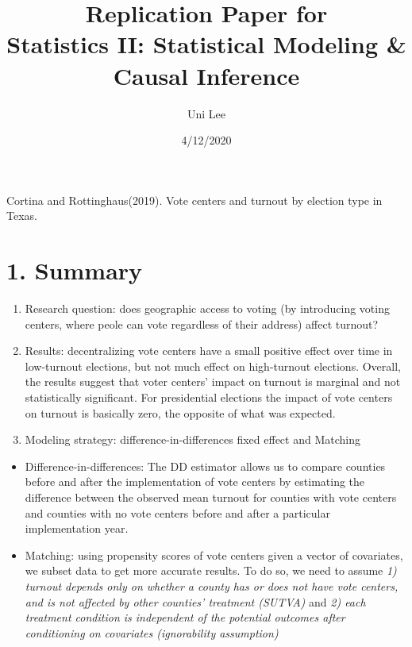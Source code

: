 \documentclass[
]{article}
\title{Replication Paper for\\
Statistics II: Statistical Modeling \& Causal Inference}
\author{Uni Lee}
\date{4/12/2020}
\providecommand{\tightlist}{%
  \setlength{\itemsep}{0pt}\setlength{\parskip}{0pt}}
\begin{document}
\maketitle

{
\setcounter{tocdepth}{2}
\tableofcontents
}
Cortina and Rottinghaus(2019). Vote centers and turnout by election type
in Texas.

\hypertarget{summary}{%
\section{1. Summary}\label{summary}}

\begin{enumerate}
\def\labelenumi{\arabic{enumi}.}
\item
  Research question: does geographic access to voting (by introducing
  voting centers, where peole can vote regardless of their address)
  affect turnout?
\item
  Results: decentralizing vote centers have a small positive effect over
  time in low-turnout elections, but not much effect on high-turnout
  elections. Overall, the results suggest that voter centers' impact on
  turnout is marginal and not statistically significant. For
  presidential elections the impact of vote centers on turnout is
  basically zero, the opposite of what was expected.
\item
  Modeling strategy: difference-in-differences fixed effect and Matching
\end{enumerate}

\begin{itemize}
\tightlist
\item
  Difference-in-differences: The DD estimator allows us to compare
  counties before and after the implementation of vote centers by
  estimating the difference between the observed mean turnout for
  counties with vote centers and counties with no vote centers before
  and after a particular implementation year.
\item
  Matching: using propensity scores of vote centers given a vector of
  covariates, we subset data to get more accurate results. To do so, we
  need to assume \emph{1) turnout depends only on whether a county has
  or does not have vote centers, and is not affected by other counties'
  treatment (SUTVA)} and \emph{2) each treatment condition is
  independent of the potential outcomes after conditioning on covariates
  (ignorability assumption)}
\end{itemize}
\end{document}
